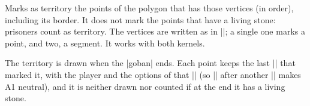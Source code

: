 	\begin{command}{\territory{}}
		Marks as territory the points of the polygon that has those vertices (in order), including its border. It does not mark the points that have a living stone: prisoners count as territory. The vertices are written as in |\stones|; a single one marks a point, and two, a segment. It works with both kernels.

		The territory is drawn when the |goban| ends. Each point keeps the last |\territory| that marked it, with the player and the options of that |\territory| (so || after another |\territory| makes A1 neutral), and it is neither drawn nor counted if at the end it has a living stone.

		\begin{codeexample}[width=4.75cm]
			\begin{goban}[label = {at = {above, left}}]

			\end{goban}
		\end{codeexample}
	\end{command}

